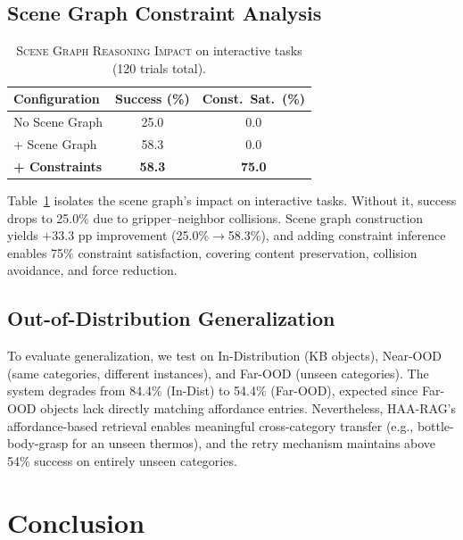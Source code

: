 \documentclass[letterpaper, 10pt, conference]{ieeeconf}
\newcommand{\haarag}{HAA-RAG}
\begin{document}
\subsection{Scene Graph Constraint Analysis}
\label{sec:sg_exp}

\begin{table}[t]
\centering
\caption{\textsc{Scene Graph Reasoning Impact} on interactive tasks (120 trials total).}
\label{tab:scene_graph}
\renewcommand{\arraystretch}{1.08}
\begin{tabular}{@{}lcc@{}}
\toprule
\textbf{Configuration} & \textbf{Success (\%)} & \textbf{Const.\ Sat.\ (\%)} \\
\midrule
No Scene Graph & 25.0 & 0.0 \\
+ Scene Graph & 58.3 & 0.0 \\
\textbf{+ Constraints} & \textbf{58.3} & \textbf{75.0} \\
\bottomrule
\end{tabular}
\vspace{-2mm}
\end{table}

Table~\ref{tab:scene_graph} isolates the scene graph's impact on interactive tasks.
Without it, success drops to 25.0\% due to gripper--neighbor collisions.
Scene graph construction yields $+33.3$ pp improvement (25.0\%$\to$58.3\%), and adding constraint inference enables 75\% constraint satisfaction, covering content preservation, collision avoidance, and force reduction.

\subsection{Out-of-Distribution Generalization}
\label{sec:ood}

To evaluate generalization, we test on In-Distribution (KB objects), Near-OOD (same categories, different instances), and Far-OOD (unseen categories).
The system degrades from 84.4\% (In-Dist) to 54.4\% (Far-OOD), expected since Far-OOD objects lack directly matching affordance entries.
Nevertheless, \haarag{}'s affordance-based retrieval enables meaningful cross-category transfer (e.g., bottle-body-grasp for an unseen thermos), and the retry mechanism maintains above 54\% success on entirely unseen categories.

\section{Conclusion}
\label{sec:conclusion}
\end{document}
